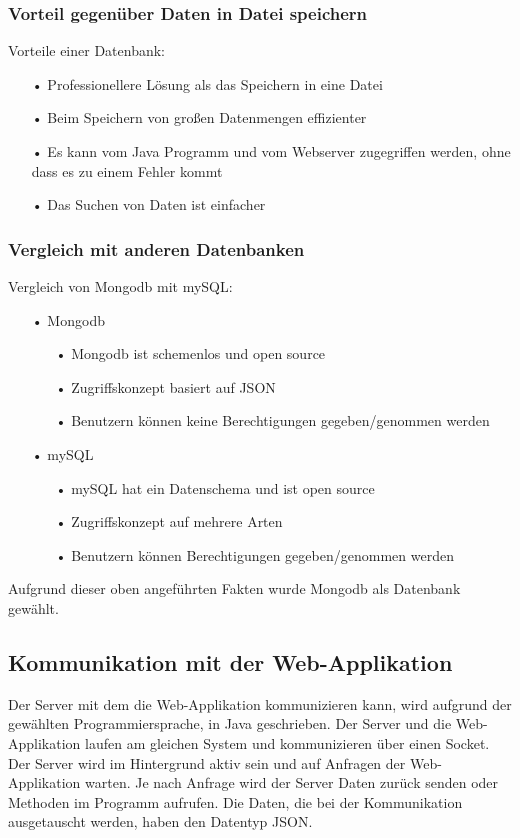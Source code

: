 \subsubsection{Vorteil gegenüber Daten in Datei speichern}
Vorteile einer Datenbank:
\begin{itemize}
\item[•] Professionellere Lösung als das Speichern in eine Datei
\item[•] Beim Speichern von großen Datenmengen effizienter
\item[•] Es kann vom Java Programm und vom Webserver zugegriffen werden, ohne dass es zu einem Fehler kommt
\item[•] Das Suchen von Daten ist einfacher
\end{itemize}
\subsubsection{Vergleich mit anderen Datenbanken}
Vergleich von Mongodb mit mySQL:
\begin{itemize}
\item[•] Mongodb
\begin{itemize}
\item[•] Mongodb ist schemenlos und open source
\item[•] Zugriffskonzept basiert auf \ac{JSON}
\item[•] Benutzern können keine Berechtigungen gegeben/genommen werden
\end{itemize}
\item[•] mySQL
\begin{itemize}
\item[•] mySQL hat ein Datenschema und ist open source
\item[•] Zugriffskonzept auf mehrere Arten
\item[•] Benutzern können Berechtigungen gegeben/genommen werden
\end{itemize}
\end{itemize}

Aufgrund dieser oben angeführten Fakten wurde Mongodb als Datenbank gewählt.

\subsection{Kommunikation mit der Web-Applikation}
Der Server mit dem die Web-Applikation kommunizieren kann, wird aufgrund der gewählten Programmiersprache, in Java geschrieben. Der Server und die Web-Applikation laufen am gleichen System und kommunizieren über einen Socket. Der Server wird im Hintergrund aktiv sein und auf Anfragen der Web-Applikation warten. Je nach Anfrage wird der Server Daten zurück senden oder Methoden im Programm aufrufen. Die Daten, die bei der Kommunikation ausgetauscht werden, haben den Datentyp \ac{JSON}.

